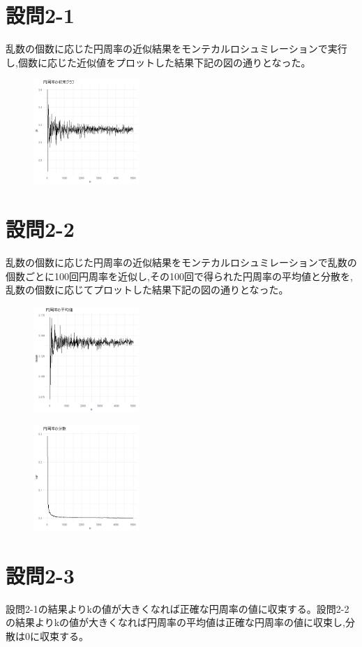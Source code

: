 \documentclass[fontsize = 10pt, paper= a4,twocolumn,column_gap=5zw]{jlreq}
\begin{document}
\section{設問2-1}
乱数の個数に応じた円周率の近似結果をモンテカルロシュミレーションで実行し,個数に応じた近似値をプロットした結果下記の図の通りとなった。
\begin{figure}
    \centering
    \includegraphics[width=4cm]{7-2-1.png}
\end{figure}

\section{設問2-2}
乱数の個数に応じた円周率の近似結果をモンテカルロシュミレーションで乱数の個数ごとに100回円周率を近似し,その100回で得られた円周率の平均値と分散を,乱数の個数に応じてプロットした結果下記の図の通りとなった。
\begin{figure}
    \centering
    \includegraphics[width=4cm]{7-2-2.png}
\end{figure}

\begin{figure}
    \centering
    \includegraphics[width=4cm]{7-2-3.png}
\end{figure}

\section{設問2-3}
設問2-1の結果よりkの値が大きくなれば正確な円周率の値に収束する。設問2-2の結果よりkの値が大きくなれば円周率の平均値は正確な円周率の値に収束し,分散は0に収束する。
\end{document}
